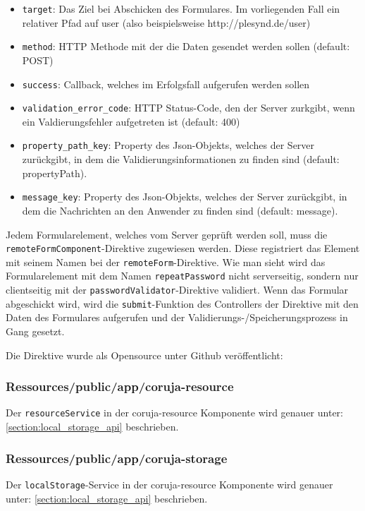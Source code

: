 \begin{itemize}
 \item \texttt{target}: Das Ziel bei Abschicken des Formulares. Im vorliegenden Fall ein relativer Pfad auf user (also beispielsweise http://plesynd.de/user)
 \item \texttt{method}: HTTP Methode mit der die Daten gesendet werden sollen (default: POST)
 \item \texttt{success}: Callback, welches im Erfolgsfall aufgerufen werden sollen
 \item \texttt{validation\_error\_code}: HTTP Status-Code, den der Server zurkgibt, wenn ein Valdierungsfehler aufgetreten ist (default: 400)
 \item \texttt{property\_path\_key}: Property des Json-Objekts, welches der Server zurückgibt, in dem die Validierungsinformationen zu finden sind (default: propertyPath).
 \item \texttt{message\_key}: Property des Json-Objekts, welches der Server zurückgibt, in dem die Nachrichten an den Anwender zu finden sind (default: message).
\end{itemize}
Jedem Formularelement, welches vom Server geprüft werden soll, muss die \texttt{remoteFormComponent}-Direktive zugewiesen werden. Diese registriert das Element mit seinem Namen bei der \texttt{remoteForm}-Direktive. Wie man sieht wird das Formularelement mit dem Namen \texttt{repeatPassword} nicht serverseitig, sondern nur clientseitig mit der \texttt{passwordValidator}-Direktive validiert. Wenn das Formular abgeschickt wird, wird die \texttt{submit}-Funktion des Controllers der Direktive mit den Daten des Formulares aufgerufen und der Validierungs-/Speicherungsprozess in Gang gesetzt.

Die Direktive wurde als Opensource unter Github veröffentlicht: 

\subsubsection{Ressources/public/app/coruja-resource}
Der \texttt{resourceService} in der coruja-resource Komponente wird genauer unter: \ref{section:local_storage_api} beschrieben.

\subsubsection{Ressources/public/app/coruja-storage}
Der \texttt{localStorage}-Service in der coruja-resource Komponente wird genauer unter: \ref{section:local_storage_api} beschrieben.

